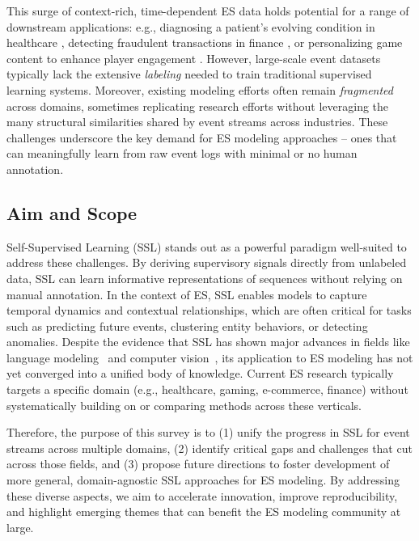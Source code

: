 \documentclass[twoside,11pt]{article}
\begin{document}
This surge of context-rich, time-dependent ES data holds potential for a range of downstream applications: e.g., diagnosing a patient’s evolving condition in healthcare , detecting fraudulent transactions in finance , or personalizing game content to enhance player engagement . However, large-scale event datasets typically lack the extensive {\it labeling} needed to train traditional supervised learning systems. Moreover, existing modeling efforts often remain {\it fragmented} across domains, sometimes replicating research efforts without leveraging the many structural similarities shared by event streams across industries. These challenges underscore the key demand for ES modeling approaches -- ones that can meaningfully learn from raw event logs with minimal or no human annotation.


\subsection{Aim and Scope}

Self-Supervised Learning (SSL) stands out as a powerful paradigm well-suited to address these challenges. By deriving supervisory signals directly from unlabeled data, SSL can learn informative representations of sequences without relying on manual annotation. In the context of ES, SSL enables models to capture temporal dynamics and contextual relationships, which are often critical for tasks such as predicting future events, clustering entity behaviors, or detecting anomalies. Despite the evidence that SSL has shown major advances in fields like language modeling~ and computer vision~, its application to ES modeling has not yet converged into a unified body of knowledge. 
Current ES research typically targets a specific domain (e.g., healthcare, gaming, e-commerce, finance) without systematically building on or comparing methods across these verticals.

Therefore, the purpose of this survey is to (1) unify the progress in SSL for event streams across multiple domains, (2) identify critical gaps and challenges that cut across those fields, and (3) propose future directions to foster development of more general, domain-agnostic SSL approaches for ES modeling. By addressing these diverse aspects, we aim to accelerate innovation, improve reproducibility, and highlight emerging themes that can benefit the ES modeling community at large.
\end{document}

